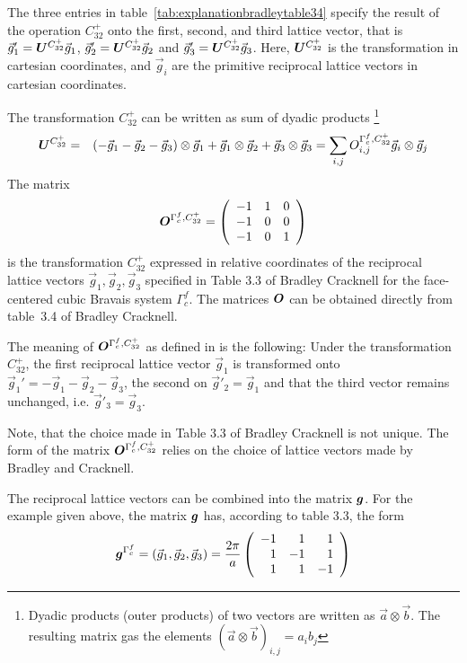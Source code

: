 \documentclass[11pt,a4paper]{report}
\begin{document}
The three entries in table~\ref{tab:explanationbradleytable34} specify
the result of the operation $C^+_{32}$ onto the first, second, and
third lattice vector, that is
$\vec{g}'_1=\bm{U}^{C^+_{32}}\vec{g}_1$,
$\vec{g}'_2=\bm{U}^{C^+_{32}}\vec{g}_2$ and
$\vec{g}'_3=\bm{U}^{C^+_{32}}\vec{g}_3$. Here, $\bm{U}^{C^+_{32}}$
is the transformation in cartesian coordinates, and $\vec{g}_i$ are
the primitive reciprocal lattice vectors in cartesian coordinates.


The transformation $C^+_{32}$ can be written as sum of dyadic products
\footnote{Dyadic products (outer products) of two vectors are written
  as $\vec{a}\otimes\vec{b}$. The resulting matrix gas the elements
  $(\vec{a}\otimes\vec{b})_{i,j}=a_ib_j$}
\begin{eqnarray}
\bm{U}^{C^+_{32}}&=&
(-\vec{g}_1-\vec{g}_2-\vec{g}_3)\otimes\vec{g}_1
+\vec{g}_1\otimes\vec{g}_2
+\vec{g}_3\otimes\vec{g}_3
=\sum_{i,j}O^{\Gamma^f_c,C^+_{32}}_{i,j}  \vec{g}_i\otimes\vec{g}_j
\end{eqnarray}
The matrix 
\begin{eqnarray}
\bm{O}^{\Gamma^f_c,C^+_{32}} =
\left(\begin{array}{ccc}
-1 & 1 & 0 \\
-1 & 0 & 0 \\
-1 & 0 & 1\\
\end{array}\right)
\label{eq:Oex}
\end{eqnarray}
is the transformation $C^+_{32}$ expressed in relative coordinates of
the reciprocal lattice vectors $\vec{g}_1,\vec{g}_2,\vec{g}_3$
specified in Table 3.3 of Bradley Cracknell\cite{bradley72_book} for
the face-centered cubic Bravais system $\Gamma^f_c$.  The matrices
$\bm{O}$ can be obtained directly from table~3.4 of Bradley
Cracknell\cite{bradley72_book}.

The meaning of $\bm{O}^{\Gamma^f_c,C^+_{32}}$ as defined in
 is the following: Under the transformation $C^+_{32}$, the
first reciprocal lattice vector $\vec{g}_1$ is transformed onto
$\vec{g}_1'=-\vec{g}_1-\vec{g}_2-\vec{g}_3$, the second on
$\vec{g}'_2=\vec{g}_1$ and that the third vector remains unchanged,
i.e. $\vec{g}'_3=\vec{g}_3$.

Note, that the choice made in Table 3.3 of Bradley Cracknell is not
unique. The form of the matrix $\bm{O}^{\Gamma^f_c,C^+_{32}}$ relies on the choice of lattice vectors made by Bradley and Cracknell.

The reciprocal lattice vectors can be combined into the matrix
$\bm{g}$. For the example given above, the matrix $\bm{g}$ has,
according to table 3.3, the form
\begin{eqnarray}
\bm{g}^{\Gamma^f_c}=(\vec{g}_1,\vec{g}_2,\vec{g}_3)=\frac{2\pi}{a}
\left(
\begin{array}{rrr}
-1 & 1& 1\\
 1 & -1& 1\\
 1 & 1& -1 \\
\end{array}\right)
\label{eq:matrixgforgfc}
\end{eqnarray}
\end{document}
